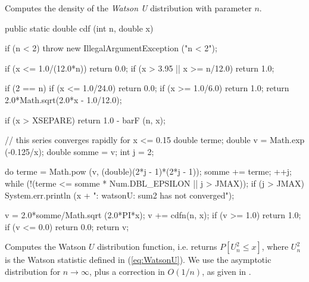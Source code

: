 \begin{tabb} Computes the density of the {\em Watson U\/} distribution
  with parameter $n$.
\end{tabb}
\begin{code}

   public static double cdf (int n, double x)\begin{hide} {
      if (n < 2)
         throw new IllegalArgumentException ("n < 2");

      if (x <= 1.0/(12.0*n))
         return 0.0;
      if (x > 3.95 || x >= n/12.0)
         return 1.0;

      if (2 == n) {
         if (x <= 1.0/24.0)
            return 0.0;
         if (x >= 1.0/6.0)
            return 1.0;
         return 2.0*Math.sqrt(2.0*x - 1.0/12.0);
      }

      if (x > XSEPARE)
         return 1.0 - barF (n, x);

      // this series converges rapidly for x <= 0.15
      double terme;
      double v = Math.exp (-0.125/x);
      double somme = v;
      int j = 2;

      do {
         terme = Math.pow (v, (double)(2*j - 1)*(2*j - 1));
         somme += terme;
         ++j;
      } while (!(terme <= somme * Num.DBL_EPSILON || j > JMAX));
      if (j > JMAX)
         System.err.println (x + ": watsonU:  sum2 has not converged");

      v = 2.0*somme/Math.sqrt (2.0*PI*x);
      v += cdfn(n, x);
      if (v >= 1.0)
         return 1.0;
      if (v <= 0.0)
         return 0.0;
       return v;
   }\end{hide}
\end{code}
\begin{tabb}
  Computes the Watson $U$ distribution function, i.e. returns
  $P[U_n^2 \le x]$, where $U_n^2$ is the Watson statistic  
  defined in (\ref{eq:WatsonU}). We use the asymptotic distribution for
$n \to\infty$, plus a correction in $O(1/n)$, as given in \cite{tCSO96a}.

 \end{tabb}
